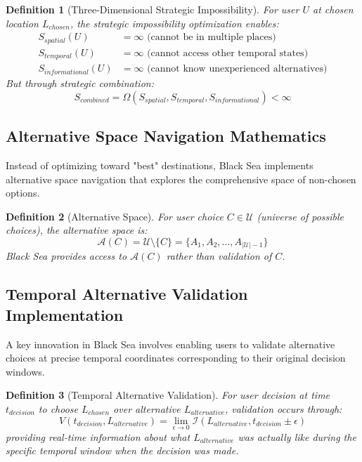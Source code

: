 \documentclass[12pt,a4paper]{article}
\newtheorem{definition}{Definition}
\begin{document}
\begin{definition}[Three-Dimensional Strategic Impossibility]
For user $U$ at chosen location $L_{chosen}$, the strategic impossibility optimization enables:
\begin{align}
S_{spatial}(U) &= \infty \text{ (cannot be in multiple places)} \\
S_{temporal}(U) &= \infty \text{ (cannot access other temporal states)} \\
S_{informational}(U) &= \infty \text{ (cannot know unexperienced alternatives)}
\end{align}
But through strategic combination:
\begin{equation}
S_{combined} = \Omega(S_{spatial}, S_{temporal}, S_{informational}) < \infty
\end{equation}
\end{definition}

\subsection{Alternative Space Navigation Mathematics}

Instead of optimizing toward "best" destinations, Black Sea implements alternative space navigation that explores the comprehensive space of non-chosen options.

\begin{definition}[Alternative Space]
For user choice $C \in \mathcal{U}$ (universe of possible choices), the alternative space is:
\begin{equation}
\mathcal{A}(C) = \mathcal{U} \setminus \{C\} = \{A_1, A_2, \ldots, A_{|\mathcal{U}|-1}\}
\end{equation}
Black Sea provides access to $\mathcal{A}(C)$ rather than validation of $C$.
\end{definition}

\subsection{Temporal Alternative Validation Implementation}

A key innovation in Black Sea involves enabling users to validate alternative choices at precise temporal coordinates corresponding to their original decision windows.

\begin{definition}[Temporal Alternative Validation]
For user decision at time $t_{decision}$ to choose $L_{chosen}$ over alternative $L_{alternative}$, validation occurs through:
\begin{equation}
V(t_{decision}, L_{alternative}) = \lim_{\epsilon \rightarrow 0} \mathcal{I}(L_{alternative}, t_{decision} \pm \epsilon)
\end{equation}
providing real-time information about what $L_{alternative}$ was actually like during the specific temporal window when the decision was made.
\end{definition}
\end{document}
